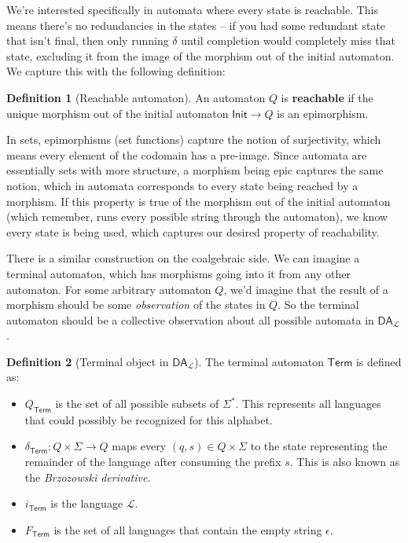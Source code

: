 \documentclass{article}
\theoremstyle{plain}
\theoremstyle{definition}
\newtheorem{definition}{Definition}
\begin{document}
We're interested specifically in automata where every state is reachable. This means there's no redundancies in the states -- if you had some redundant state that isn't final, then only running \ensuremath{\delta} until completion would completely miss that state, excluding it from the image of the morphism out of the initial automaton. We capture this with the following definition:

\begin{definition}[Reachable automaton]
 An automaton \ensuremath{Q} is \textbf{reachable} if the unique morphism out of the initial automaton \ensuremath{\mathsf{Init} \rightarrow Q} is an epimorphism. 
\end{definition}
\label{reachableAutomaton} 

In sets, epimorphisms (set functions) capture the notion of surjectivity, which means every element of the codomain has a pre-image. Since automata are essentially sets with more structure, a morphism being epic captures the same notion, which in automata corresponds to every state being reached by a morphism. If this property is true of the morphism out of the initial automaton (which remember, runs every possible string through the automaton), we know every state is being used, which captures our desired property of reachability.

There is a similar construction on the coalgebraic side. We can imagine a terminal automaton, which has morphisms going into it from any other automaton. For some arbitrary automaton \ensuremath{Q}, we'd imagine that the result of a morphism should be some \emph{observation} of the states in \ensuremath{Q}. So the terminal automaton should be a collective observation about all possible automata in \ensuremath{{\mathsf{DA}}_{\mathcal{L}}}.

\begin{definition}[Terminal object in \ensuremath{{\mathsf{DA}}_{\mathcal{L}}}]
 The terminal automaton \ensuremath{\mathsf{Term}} is defined as: \begin{itemize}
\item \ensuremath{{Q}_{\mathsf{Term}}} is the set of all possible subsets of \ensuremath{{\Sigma }^{\ast }}. This represents all languages that could possibly be recognized for this alphabet.
\item \ensuremath{{\delta }_{\mathsf{Term}} : Q \times \Sigma \rightarrow Q} maps every \ensuremath{\left( q, s \right) \in Q \times \Sigma} to the state representing the remainder of the language after consuming the prefix \ensuremath{s}. This is also known as the \emph{Brzozowski derivative}.
\item \ensuremath{{i}_{\mathsf{Term}}} is the language \ensuremath{\mathcal{L}}.
\item \ensuremath{{F}_{\mathsf{Term}}} is the set of all languages that contain the empty string \ensuremath{\epsilon}.
\end{itemize}

\end{definition}
\end{document}
